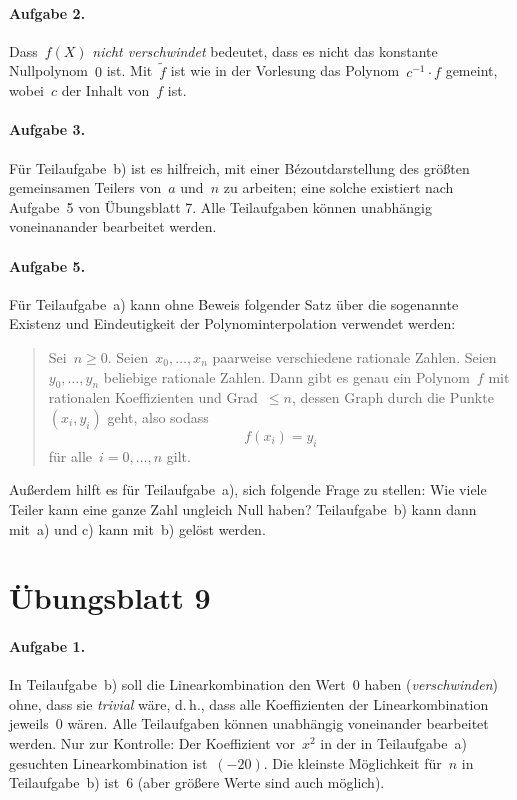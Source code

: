 \documentclass{../algblatt}
\begin{document}
\paragraph{Aufgabe 2.} Dass~$f(X)$ \emph{nicht verschwindet} bedeutet, dass es
nicht das konstante Nullpolynom~$0$ ist. Mit~$\widetilde f$ ist wie in der Vorlesung das
Polynom~$c^{-1} \cdot f$ gemeint, wobei~$c$ der Inhalt von~$f$ ist.

\paragraph{Aufgabe 3.} Für Teilaufgabe~b) ist es hilfreich, mit einer
Bézoutdarstellung des größten gemeinsamen Teilers von~$a$ und~$n$ zu arbeiten;
eine solche existiert nach Aufgabe~5 von Übungsblatt 7. Alle Teilaufgaben
können unabhängig voneinanander bearbeitet werden.

\paragraph{Aufgabe 5.} Für Teilaufgabe~a) kann ohne Beweis folgender Satz
über die sogenannte Existenz und Eindeutigkeit der Polynominterpolation verwendet werden:
\begin{quote}
Sei~$n \geq 0$. Seien~$x_0, \ldots, x_n$ paarweise verschiedene rationale Zahlen. Seien~$y_0,
\ldots, y_n$ beliebige rationale Zahlen. Dann gibt es genau ein Polynom~$f$ mit
rationalen Koeffizienten und Grad~$\leq n$, dessen Graph durch die Punkte~$(x_i,
y_i)$ geht, also sodass
\[ f(x_i) = y_i \]
für alle~$i = 0,\ldots,n$ gilt.
\end{quote}
Außerdem hilft es für Teilaufgabe~a), sich
folgende Frage zu stellen: Wie viele Teiler kann eine ganze Zahl ungleich Null
haben?
Teilaufgabe~b) kann dann mit~a) und c) kann mit~b) gelöst werden.


\section*{Übungsblatt 9}

\paragraph{Aufgabe 1.} In Teilaufgabe~b) soll die Linearkombination den Wert~0
haben (\emph{verschwinden}) ohne, dass sie \emph{trivial} wäre, d.\,h., dass
alle Koeffizienten der Linearkombination jeweils~0 wären. Alle Teilaufgaben
können unabhängig voneinander bearbeitet werden. Nur zur Kontrolle: Der
Koeffizient vor~$x^2$ in der in Teilaufgabe~a) gesuchten Linearkombination
ist~$(-20)$. Die kleinste Möglichkeit für~$n$ in Teilaufgabe~b) ist~$6$ (aber
größere Werte sind auch möglich).
\end{document}

